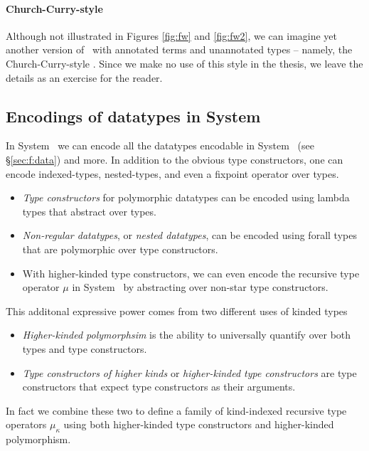 \paragraph{Church-Curry-style \Fw}
Although not illustrated in Figures \ref{fig:fw} and \ref{fig:fw2},
we can imagine yet another version of \Fw\ with annotated terms
and unannotated types -- namely, the Church-Curry-style \Fw.
Since we make no use of this style in the thesis, we leave the details
as an exercise for the reader.

\subsection{Encodings of datatypes in System \Fw}
\label{sec:fw:data}
In System \Fw\ we can encode all the datatypes encodable in System \F\ (see
\S\ref{sec:f:data}) and more. In addition
to the obvious type constructors, one can encode indexed-types, nested-types, and even
a fixpoint operator over types.

\begin{itemize}

\item \emph{Type constructors} for polymorphic datatypes
can be encoded using lambda types that abstract over types.


\item \emph{Non-regular datatypes}, or \emph{nested datatypes}, can be encoded
using forall types that are polymorphic over type constructors.

\item With higher-kinded type constructors, we can even encode
the recursive type operator $\mu$ in System \Fw\ by abstracting
over non-star type constructors.
\end{itemize}

This additonal expressive power comes from two different uses of kinded types

\begin{itemize}

\item  \emph{Higher-kinded polymorphsim} is the ability to universally quantify over both types and
type constructors.

\item 
\emph{Type constructors of higher kinds} or \emph{higher-kinded
type constructors} are type constructors that expect type constructors
as their arguments.
\end{itemize}

In fact we combine these two to define 
a family of kind-indexed recursive type operators $\mu_\kappa$ using both
higher-kinded type constructors and higher-kinded polymorphism.



